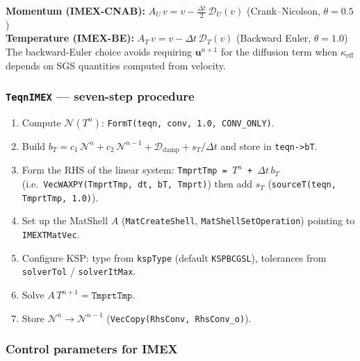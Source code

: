 \documentclass[12pt,a4paper]{article}
\begin{document}
\begin{tcolorbox}[colback=blue!5,colframe=blue!50!black,title=Key difference from momentum IMEX]
  \textbf{Momentum (IMEX-CNAB):}
  $A_U\,v = v - \tfrac{\Delta t}{2}\,\mathcal{D}_U(v)$
  \hfill (Crank--Nicolson, $\theta=0.5$)\\[4pt]
  \textbf{Temperature (IMEX-BE):}
  $A_T\,v = v - \Delta t\,\mathcal{D}_T(v)$
  \hfill (Backward Euler, $\theta=1.0$)\\[4pt]
  The backward-Euler choice avoids requiring $\mathbf{u}^{n+1}$ for
  the diffusion term when $\kappa_{\text{eff}}$ depends on SGS quantities
  computed from velocity.
\end{tcolorbox}

\subsubsection*{\texttt{TeqnIMEX} — seven-step procedure}

\begin{enumerate}
  \item[\textbf{1.}] Compute $\mathcal{N}(T^n)$:
        \texttt{FormT(teqn, conv, 1.0, CONV\_ONLY)}.
  \item[\textbf{2.}] Build $b_T = c_1\,\mathcal{N}^n + c_2\,\mathcal{N}^{n-1}
        + \mathcal{D}_{\text{damp}} + s_T/\Delta t$
        and store in \texttt{teqn->bT}.
  \item[\textbf{3.}] Form the RHS of the linear system:
        \texttt{TmprtTmp = $T^n$ + $\Delta t\,b_T$} \;
        (i.e.\ \texttt{VecWAXPY(TmprtTmp, dt, bT, Tmprt)})
        then add $s_T$ (\texttt{sourceT(teqn, TmprtTmp, 1.0)}).
  \item[\textbf{4.}] Set up the MatShell $A$ (\texttt{MatCreateShell},
        \texttt{MatShellSetOperation}) pointing to \texttt{IMEXTMatVec}.
  \item[\textbf{5.}] Configure KSP: type from \texttt{kspType} (default
        \texttt{KSPBCGSL}), tolerances from \texttt{solverTol} /
        \texttt{solverItMax}.
  \item[\textbf{6.}] Solve $A\,T^{n+1} = \texttt{TmprtTmp}$.
  \item[\textbf{7.}] Store $\mathcal{N}^n \to \mathcal{N}^{n-1}$
        (\texttt{VecCopy(RhsConv, RhsConv\_o)}).
\end{enumerate}

\subsubsection*{Control parameters for IMEX}
\end{document}
